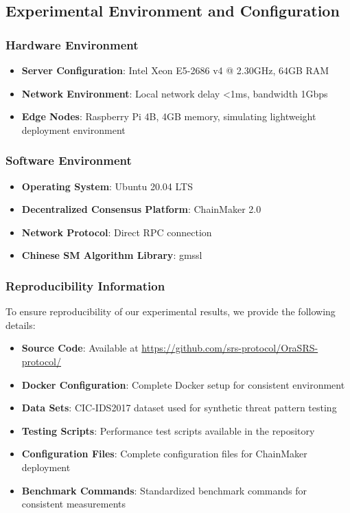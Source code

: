 \documentclass[12pt]{article}
\begin{document}
\subsection{Experimental Environment and Configuration}

\subsubsection{Hardware Environment}
\begin{itemize}
\item \textbf{Server Configuration}: Intel Xeon E5-2686 v4 @ 2.30GHz, 64GB RAM
\item \textbf{Network Environment}: Local network delay <1ms, bandwidth 1Gbps
\item \textbf{Edge Nodes}: Raspberry Pi 4B, 4GB memory, simulating lightweight deployment environment
\end{itemize}

\subsubsection{Software Environment}
\begin{itemize}
\item \textbf{Operating System}: Ubuntu 20.04 LTS
\item \textbf{Decentralized Consensus Platform}: ChainMaker 2.0
\item \textbf{Network Protocol}: Direct RPC connection
\item \textbf{Chinese SM Algorithm Library}: gmssl
\end{itemize}

\subsubsection{Reproducibility Information}
To ensure reproducibility of our experimental results, we provide the following details:
\begin{itemize}
\item \textbf{Source Code}: Available at \url{https://github.com/srs-protocol/OraSRS-protocol/}
\item \textbf{Docker Configuration}: Complete Docker setup for consistent environment
\item \textbf{Data Sets}: CIC-IDS2017 dataset used for synthetic threat pattern testing
\item \textbf{Testing Scripts}: Performance test scripts available in the repository
\item \textbf{Configuration Files}: Complete configuration files for ChainMaker deployment
\item \textbf{Benchmark Commands}: Standardized benchmark commands for consistent measurements
\end{itemize}
\end{document}
